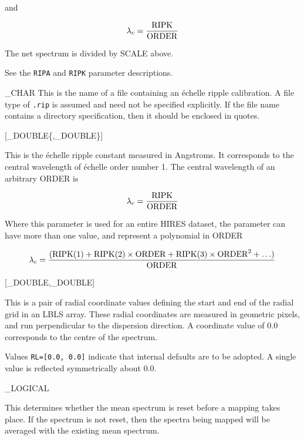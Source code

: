 {{   and

   \begin {equation}
      \lambda_c = \frac {\rm RIPK}{\rm ORDER}
   \end {equation}

   The net spectrum is divided by SCALE above.

   See the \verb+RIPA+ and \verb+RIPK+ parameter descriptions.
}

{
   \_CHAR
}{
   This is the name of a file containing an \'{e}chelle ripple calibration.
   A file type of \verb+.rip+ is assumed and need not be specified
   explicitly.
   If the file name contains a directory specification, then it should be
   enclosed in quotes.
}

{
   [\_DOUBLE\{,\_DOUBLE\}]
}{
   This is the \'{e}chelle ripple constant measured in Angstroms.
   It corresponds to the central wavelength of \'{e}chelle order number 1.
   The central wavelength of an arbitrary ORDER is

   \begin {equation}
      \lambda_c = \frac {\rm RIPK}{\rm ORDER}
   \end {equation}

   Where this parameter is used for an entire HIRES dataset, the
   parameter can have more than one value, and represent a polynomial
   in ORDER

   \begin {equation}
      \lambda_c =  \frac{({\rm RIPK}(1) + {\rm RIPK}(2)
                         \times {\rm ORDER} + {\rm RIPK}(3)
                         \times {\rm ORDER}^2 + \ldots)}
                        {\rm ORDER}
   \end {equation}
}

{
   [\_DOUBLE,\_DOUBLE]
}{
   This is a pair of radial coordinate values defining the start and end of
   the radial grid in an LBLS array.
   These radial coordinates are measured in geometric pixels, and run
   perpendicular to the dispersion direction.
   A coordinate value of 0.0 corresponds to the centre of the spectrum.

   Values \verb+RL=[0.0, 0.0]+ indicate that internal defaults are to be
   adopted.
   A single value is reflected symmetrically about 0.0.
}

{
   \_LOGICAL
}{
   This determines whether the mean spectrum is reset before a mapping
   takes place.
   If the spectrum is not reset, then the spectra being mapped will be
   averaged with the existing mean spectrum.

}}
